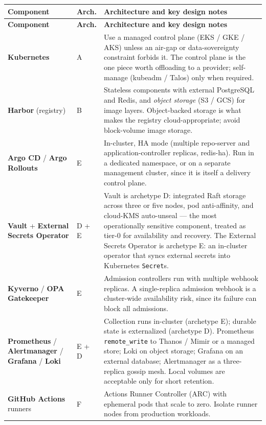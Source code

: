 \documentclass[10pt,letterpaper]{article}
\newcommand{\tool}[1]{\textbf{#1}}
\begin{document}
\small
\begin{longtable}{L{1.15in} C{0.5in} L{4.9in}}
\toprule
\textbf{Component} & \textbf{Arch.} & \textbf{Architecture and key design notes} \\
\midrule
\endfirsthead
\toprule
\textbf{Component} & \textbf{Arch.} & \textbf{Architecture and key design notes} \\
\midrule
\endhead
\bottomrule
\endfoot
\tool{Kubernetes} & A & Use a managed control plane (EKS / GKE / AKS) unless an air-gap or data-sovereignty constraint forbids it. The control plane is the one piece worth offloading to a provider; self-manage (kubeadm / Talos) only when required. \\
\tool{Harbor} \newline (registry) & B & Stateless components with external PostgreSQL and Redis, and \emph{object storage} (S3 / GCS) for image layers. Object-backed storage is what makes the registry cloud-appropriate; avoid block-volume image storage. \\
\tool{Argo CD} / \tool{Argo Rollouts} & E & In-cluster, HA mode (multiple repo-server and application-controller replicas, redis-ha). Run in a dedicated namespace, or on a separate management cluster, since it is itself a delivery control plane. \\
\tool{Vault} + \tool{External Secrets Operator} & D + E & Vault is archetype D: integrated Raft storage across three or five nodes, pod anti-affinity, and cloud-KMS auto-unseal --- the most operationally sensitive component, treated as tier-0 for availability and recovery. The External Secrets Operator is archetype E: an in-cluster operator that syncs external secrets into Kubernetes \texttt{Secret}s. \\
\tool{Kyverno} / \tool{OPA Gatekeeper} & E & Admission controllers run with multiple webhook replicas. A single-replica admission webhook is a cluster-wide availability risk, since its failure can block all admissions. \\
\tool{Prometheus} / \tool{Alertmanager} / \tool{Grafana} / \tool{Loki} & E + D & Collection runs in-cluster (archetype E); durable state is externalized (archetype D). Prometheus \texttt{remote\_write} to Thanos / Mimir or a managed store; Loki on object storage; Grafana on an external database; Alertmanager as a three-replica gossip mesh. Local volumes are acceptable only for short retention. \\
\tool{GitHub Actions} runners & F & Actions Runner Controller (ARC) with ephemeral pods that scale to zero. Isolate runner nodes from production workloads. \\

\end{longtable}
\end{document}
